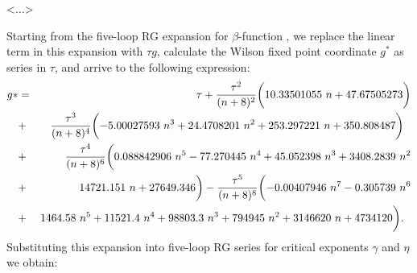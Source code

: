 \documentclass[aps,prb,preprint,showpacs,preprintnumbers,amsmath,amssymb]{revtex4}
\newcommand{\comment}[1]{} %
\begin{document}
<$\dots$>
\comment{
The critical behavior of two-dimensional systems with $O(n)$-symmetric vector
order parameters is described by Euclidean field theory with the Hamiltonian:
\begin{equation}
\label{model}
H =
\int d^2x \Biggl[{1 \over 2}( m_0^2 \varphi_{\alpha}^2
 + (\nabla \varphi_{\alpha})^2)
+ {\lambda \over 24} (\varphi_{\alpha}^2)^2 \Biggr] ,
\end{equation}
where $\varphi_{\alpha}$ is a real $n$-vector field, bare mass squared $m_0^2$
being proportional to $T - T_c^{(0)}$, $T_c^{(0)}$ -- phase transition temperature
in the absence of order parameter fluctuations. The $\beta$-function and the
critical exponents for the model (1) have been calculated within the massive
theory \cite{OS2000, COPS2004}, with the Green function, the four-point vertex
and the $\phi^2$ insertion normalized in a conventional way:

\begin{eqnarray}
\label{norm}
G_R^{-1} (0, m, g_4) = m^2 , \qquad \quad
{{\partial G_R^{-1} (p, m, g_4)} \over {\partial p^2}}
\bigg\arrowvert_{p^2 = 0} = 1 , \\
\nonumber
\Gamma_R (0, 0, 0, m, g) = m^2 g_4, \qquad \quad
\Gamma_R^{1,2} (0, 0, m, g_4) = 1.
\end{eqnarray}
}
Starting from the five-loop RG expansion for $\beta$-function \cite{OS2000},
we replace the linear term in this expansion with $\tau g$, calculate the
Wilson fixed point coordinate $g^*$ as series in $\tau$, and arrive to the
following expression:
\begin{eqnarray}
\label{g-tau}
g* &=& \tau + {\tau^2 \over (n + 8)^2} \biggl( 10.33501055~n + 47.67505273 \biggr)
\nonumber \\
&+& {\tau^3 \over (n + 8)^4} \biggl(- 5.00027593~n^3 + 24.4708201~n^2 + 253.297221~n
+ 350.808487 \biggr) \ \
\nonumber \\
&+& {\tau^4 \over (n + 8)^6} \biggl( 0.088842906~n^5 - 77.270445~n^4
+ 45.052398~n^3 + 3408.2839~n^2
\nonumber \\
&+& 14721.151~n + 27649.346 \biggr) - {\tau^5 \over (n + 8)^8} \biggl(- 0.00407946~n^7
- 0.305739~n^6
\nonumber \\
&+& 1464.58~n^5 + 11521.4~n^4 + 98803.3~n^3 + 794945~n^2 + 3146620~n + 4734120 \biggr). \ \
\end{eqnarray}
Substituting this expansion into five-loop RG series for critical exponents $\gamma$
and $\eta$ \cite{OS2000, COPS2004} we obtain:
\end{document}
